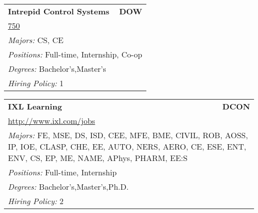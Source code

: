 \documentclass[twoside]{article}
\begin{document}
\begin{center}
\begin{multicols}{3}
\begin{FlushLeft}
\begin{minipage}{\columnwidth}
\end{minipage}
 
\begin{minipage}{\columnwidth}\begin{tabularx}{.95\columnwidth}{Xr}
                 {\Large\bf Intrepid Control Systems} & {\Large\bf DOW}\\
    \multicolumn{2}{p{.95\columnwidth}}{\url{750}}\\
    \multicolumn{2}{p{.95\columnwidth}}{\emph{Majors:} CS, CE}\\
    \multicolumn{2}{p{.95\columnwidth}}{\emph{Positions:} Full-time, Internship, Co-op}\\
    \multicolumn{2}{p{.95\columnwidth}}{\emph{Degrees:} Bachelor's,Master's}\\
    \multicolumn{2}{p{.95\columnwidth}}{\emph{Hiring Policy:} 1}\\
    \end{tabularx}
    
\end{minipage}
 
\begin{minipage}{\columnwidth}\begin{tabularx}{.95\columnwidth}{Xr}
                 {\Large\bf IXL Learning} & {\Large\bf DCON}\\
    \multicolumn{2}{p{.95\columnwidth}}{\url{http://www.ixl.com/jobs}}\\
    \multicolumn{2}{p{.95\columnwidth}}{\emph{Majors:} FE, MSE, DS, ISD, CEE, MFE, BME, CIVIL, ROB, AOSS, IP, IOE, CLASP, CHE, EE, AUTO, NERS, AERO, CE, ESE, ENT, ENV, CS, EP, ME, NAME, APhys, PHARM, EE:S}\\
    \multicolumn{2}{p{.95\columnwidth}}{\emph{Positions:} Full-time, Internship}\\
    \multicolumn{2}{p{.95\columnwidth}}{\emph{Degrees:} Bachelor's,Master's,Ph.D.}\\
    \multicolumn{2}{p{.95\columnwidth}}{\emph{Hiring Policy:} 2}\\
    \end{tabularx}
    
\end{minipage}
 

\end{FlushLeft}
\end{multicols}
\end{center}
\end{document}
